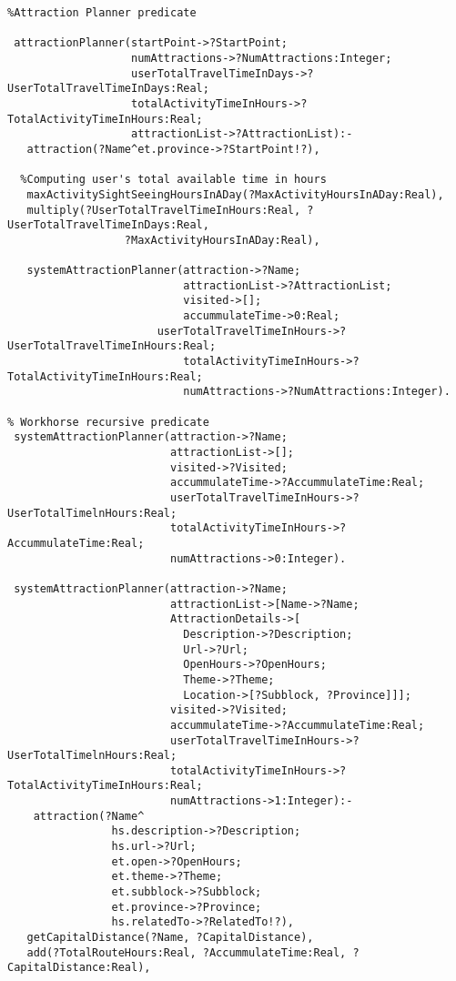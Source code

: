 \begin{verbatim}
%Attraction Planner predicate
	
 attractionPlanner(startPoint->?StartPoint; 
                   numAttractions->?NumAttractions:Integer; 
                   userTotalTravelTimeInDays->?UserTotalTravelTimeInDays:Real; 
                   totalActivityTimeInHours->?TotalActivityTimeInHours:Real; 
                   attractionList->?AttractionList):-
   attraction(?Name^et.province->?StartPoint!?),
  
  %Computing user's total available time in hours
   maxActivitySightSeeingHoursInADay(?MaxActivityHoursInADay:Real),
   multiply(?UserTotalTravelTimeInHours:Real, ?UserTotalTravelTimeInDays:Real,     
                  ?MaxActivityHoursInADay:Real),

   systemAttractionPlanner(attraction->?Name;   
                           attractionList->?AttractionList;  
                           visited->[];  
                           accummulateTime->0:Real; 
                       userTotalTravelTimeInHours->?UserTotalTravelTimeInHours:Real;
                           totalActivityTimeInHours->?TotalActivityTimeInHours:Real; 
                           numAttractions->?NumAttractions:Integer).
								  
% Workhorse recursive predicate 
 systemAttractionPlanner(attraction->?Name;   
                         attractionList->[];  
                         visited->?Visited; 
                         accummulateTime->?AccummulateTime:Real;                        
                         userTotalTravelTimeInHours->?UserTotalTimelnHours:Real;                                            
                         totalActivityTimeInHours->?AccummulateTime:Real;                                                    
                         numAttractions->0:Integer).
								
 systemAttractionPlanner(attraction->?Name;   
                         attractionList->[Name->?Name; 
                         AttractionDetails->[
                           Description->?Description; 
                           Url->?Url;
                           OpenHours->?OpenHours;
                           Theme->?Theme;
                           Location->[?Subblock, ?Province]]];  
                         visited->?Visited;  
                         accummulateTime->?AccummulateTime:Real; 
                         userTotalTravelTimeInHours->?UserTotalTimelnHours:Real; 
                         totalActivityTimeInHours->?TotalActivityTimeInHours:Real;                                              
                         numAttractions->1:Integer):-			   
    attraction(?Name^  
                hs.description->?Description; 
                hs.url->?Url; 
                et.open->?OpenHours;
                et.theme->?Theme; 
                et.subblock->?Subblock;  
                et.province->?Province;  
                hs.relatedTo->?RelatedTo!?),
   getCapitalDistance(?Name, ?CapitalDistance),
   add(?TotalRouteHours:Real, ?AccummulateTime:Real, ?CapitalDistance:Real),
        

\end{verbatim}
